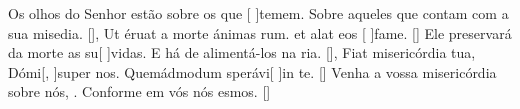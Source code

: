 {    {Os olhos do Senhor estão sobre os que [ ]{te}mem.  Sobre aqueles que contam com a sua misedia. [\LinkPT]},
  {Ut éruat a morte ánimas rum.  et alat eos [ ]{fa}me. [\LinkLA]}%
    {Ele preservará da morte as su[ ]{vi}das.  E há de alimen\-tá-los na ria. [\LinkPT]},
  {Fiat misericórdia tua, Dómi[, ]{su}per nos.  Quemádmodum sperávi[ ]{in} te. [\LinkLA]}%
    {Venha a vossa misericórdia sobre nós, .  Conforme em vós nós esmos. [\LinkPT]}
}